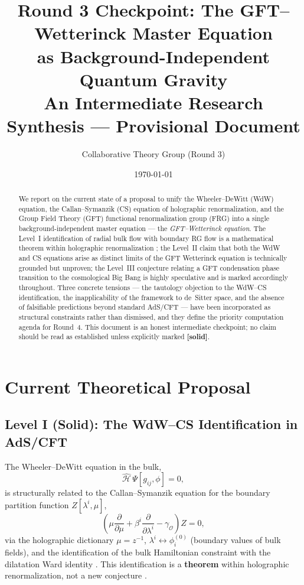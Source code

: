 \documentclass[11pt,a4paper]{article}
\title{\textbf{Round 3 Checkpoint: The GFT--Wetterinck Master Equation\\
as Background-Independent Quantum Gravity}\\[6pt]
\large An Intermediate Research Synthesis --- Provisional Document}
\author{Collaborative Theory Group (Round 3)}
\date{\today}
\begin{document}
\maketitle

\begin{abstract}
We report on the current state of a proposal to unify the Wheeler--DeWitt (WdW) equation,
the Callan--Symanzik (CS) equation of holographic renormalization, and the Group Field
Theory (GFT) functional renormalization group (FRG) into a single background-independent
master equation --- the \emph{GFT--Wetterinck equation}.
The Level~I identification of radial bulk flow with boundary RG flow is a mathematical
theorem within holographic renormalization \cite{skenderis2002,witten1998,maldacena1997};
the Level~II claim that both the WdW and CS equations arise as distinct limits of the GFT
Wetterinck equation is technically grounded but unproven; the Level~III conjecture relating
a GFT condensation phase transition to the cosmological Big Bang is highly speculative and
is marked accordingly throughout.
Three concrete tensions --- the tautology objection to the WdW--CS identification,
the inapplicability of the framework to de~Sitter space, and the absence of falsifiable
predictions beyond standard AdS/CFT --- have been incorporated as structural constraints
rather than dismissed, and they define the priority computation agenda for Round~4.
This document is an honest intermediate checkpoint; no claim should be read as established
unless explicitly marked \textbf{[solid]}.
\end{abstract}

\tableofcontents
\newpage

\section{Current Theoretical Proposal}
\label{sec:proposal}

\subsection{Level I (Solid): The WdW--CS Identification in AdS/CFT}
\label{sec:levelI}

The Wheeler--DeWitt equation in the bulk,
\begin{equation}
  \hat{\mathcal{H}}\,\Psi[g_{ij},\phi] = 0,
  \label{eq:WdW}
\end{equation}
is structurally related to the Callan--Symanzik equation for the boundary partition function
$Z[\lambda^{i},\mu]$,
\begin{equation}
  \left(\mu\frac{\partial}{\partial\mu}
        + \beta^{i}\frac{\partial}{\partial\lambda^{i}}
        - \gamma_{\mathcal{O}}\right)Z = 0,
  \label{eq:CS}
\end{equation}
via the holographic dictionary $\mu = z^{-1}$,
$\lambda^{i}\leftrightarrow\phi^{(0)}_{i}$ (boundary values of bulk fields), and the
identification of the bulk Hamiltonian constraint with the dilatation Ward
identity \cite{skenderis2002,witten1998}.
This identification is a \textbf{theorem} within holographic renormalization, not a new
conjecture \cite{maldacena1997,skenderis2002}.
\end{document}

